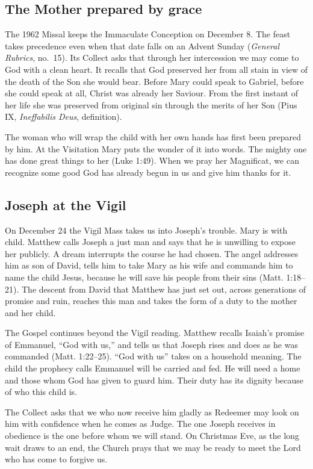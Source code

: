 \subsection{The Mother prepared by grace}
\label{sec:advent-immaculate}

The 1962 Missal keeps the Immaculate Conception on December 8. The feast
takes precedence even when that date falls on an Advent Sunday
(\emph{General Rubrics}, no.~15). Its Collect asks that through her
intercession we may come to God with a clean heart. It recalls that God
preserved her from all stain in view of the death of the Son she would
bear. Before Mary could speak to Gabriel, before she could speak at all,
Christ was already her Saviour. From the first instant of her life she
was preserved from original sin through the merits of her Son (Pius IX,
\emph{Ineffabilis Deus}, definition).

The woman who will wrap the child with her own hands has first been
prepared by him. At the Visitation Mary puts the wonder of it into words.
The mighty one has done great things to her (Luke 1:49). When we pray
her Magnificat, we can recognize some good God has already begun in us
and give him thanks for it.

\subsection{Joseph at the Vigil}

On December 24 the Vigil Mass takes us into Joseph's trouble. Mary is
with child. Matthew calls Joseph a just man and says that he is unwilling
to expose her publicly. A dream interrupts the course he had chosen.
The angel addresses him as son of David, tells him to take Mary as his
wife and commands him to name the child Jesus, because he will save his
people from their sins (Matt. 1:18--21). The descent from David that
Matthew has just set out, across generations of promise and ruin, reaches
this man and takes the form of a duty to the mother and her child.

The Gospel continues beyond the Vigil reading. Matthew recalls Isaiah's
promise of Emmanuel, “God with us,” and tells us that Joseph rises and
does as he was commanded (Matt. 1:22--25). “God with us” takes on a
household meaning. The child the prophecy calls Emmanuel will be carried and fed. He
will need a home and those whom God has given to guard him. Their duty
has its dignity because of who this child is.

The Collect asks that we who now receive him gladly as Redeemer may
look on him with confidence when he comes as Judge. The one Joseph
receives in obedience is the one before whom we will stand. On Christmas
Eve, as the long wait draws to an end, the Church prays that we may be
ready to meet the Lord who has come to forgive us.

